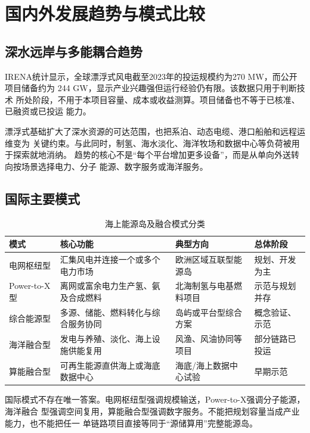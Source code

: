 \section{国内外发展趋势与模式比较}

\subsection{深水远岸与多能耦合趋势}

IRENA统计显示，全球漂浮式风电截至2023年的投运规模约为270 MW，而公开项目储备约为
244 GW，显示产业兴趣强但运行经验仍有限\cite{irena-floating}。该数据只用于判断技术
所处阶段，不用于本项目容量、成本或收益测算。项目储备也不等于已核准、已融资或已投运
能力。

漂浮式基础扩大了深水资源的可达范围，也把系泊、动态电缆、港口船舶和远程运维变为
关键约束。与此同时，制氢、海水淡化、海洋牧场和数据中心等负荷被用于探索就地消纳。
趋势的核心不是“每个平台增加更多设备”，而是从单向外送转向按场景选择电力、分子
能源、数字服务或海洋服务。

\subsection{国际主要模式}

\begin{table}[H]
\centering
\caption{海上能源岛及融合模式分类}
\label{tab:c2-international-modes}
\begin{tabularx}{\textwidth}{p{2.4cm} X X p{2.4cm}}
\toprule
模式 & 核心功能 & 典型方向 & 总体阶段\\
\midrule
电网枢纽型 & 汇集风电并连接一个或多个电力市场 & 欧洲区域互联型能源岛 & 规划、开发为主\\
Power-to-X型 & 离网或富余电力生产氢、氨及合成燃料 & 北海制氢与电基燃料项目 & 示范与规划并存\\
综合能源型 & 多源、储能、燃料转化与综合服务协同 & 岛屿或平台型综合方案 & 概念验证、示范\\
海洋融合型 & 发电与养殖、淡化、海上设施供能复用 & 风渔、风油协同等项目 & 部分链路已投运\\
算能融合型 & 可再生能源直供海上或海底数据中心 & 海底/海上数据中心试验 & 早期示范\\
\bottomrule
\end{tabularx}
\end{table}

国际模式不存在唯一答案。电网枢纽型强调规模输送，Power-to-X强调分子能源，海洋融合
型强调空间复用，算能融合型强调数字服务。不能把规划容量当成产业能力，也不能把任一
单链路项目直接等同于“源储算用”完整能源岛。

